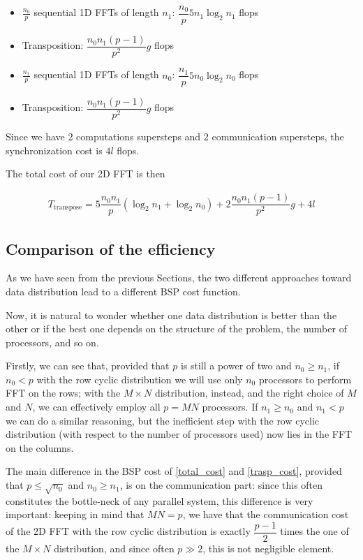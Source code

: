 \documentclass[a4paper,11pt]{article}
\begin{document}
\begin{itemize}
\item $\frac{n_0}{p}$ sequential 1D FFTs of length $n_1$: $\dfrac{n_0}{p} 5n_1 \log_2 n_1$ flops
\item Transposition: $\dfrac{n_0 n_1 (p-1)}{p^2}g$ flops
\item $\frac{n_1}{p}$ sequential 1D FFTs of length $n_0$: $\dfrac{n_1}{p} 5n_0 \log_2 n_0$ flops
\item Transposition: $\dfrac{n_0 n_1 (p-1)}{p^2}g$ flops
\end{itemize}

Since we have 2 computations supersteps and 2 communication supersteps, the synchronization cost is $4l$ flops.

The total cost of our 2D FFT is then

\begin{align}
\label{trasp_cost} T_\text{transpose} = 5 \dfrac{n_0 n_1}{p} ( \log_2 n_1+ \log_2 n_0 )+ 2 \dfrac{n_0 n_1 (p-1)}{p^2}g + 4l
\end{align}

\subsection{Comparison of the efficiency} \label{sec:eff}

As we have seen from the previous Sections, the two different approaches toward data distribution lead to a different BSP cost function.

Now, it is natural to wonder whether one data distribution is better than the other or if the best one depends on the structure of the problem, the number of processors, and so on.

Firstly, we can see that, provided that $p$ is still a power of two and $n_0 \geq n_1$, if $n_0 < p$ with the row cyclic distribution we will use only $n_0$ processors to perform FFT on the rows; with the $M \times N$ distribution, instead, and the right choice of $M$ and $N$, we can effectively employ all $p=MN$ processors. If $n_1 \geq n_0$ and $n_1 < p$ we can do a similar reasoning, but the inefficient step with the row cyclic distribution (with respect to the number of processors used) now lies in the FFT on the columns.

The main difference in the BSP cost of \eqref{total_cost} and \eqref{trasp_cost}, provided that $p \leq \sqrt{n_0}$ and $n_0 \geq n_1$, is on the communication part: since this often constitutes the bottle-neck of any parallel system, this difference is very important: keeping in mind that $MN=p$, we have that the communication cost of the 2D FFT with the row cyclic distribution is exactly $\dfrac{p-1}{2}$ times the one of the $M \times N$ distribution, and since often $p \gg 2$, this is not negligible element.
\end{document}

